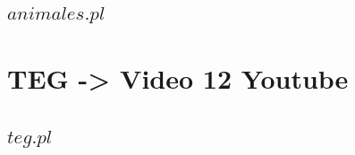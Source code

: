 \documentclass[11pt,a4paper]{article}
\begin{document}
\subsection{$animales.pl$}
 

\newpage

\section{TEG -> Video 12 Youtube}

\subsection{$teg.pl$}
 


 
\newpage

\appendix


%
%
\end{document}

